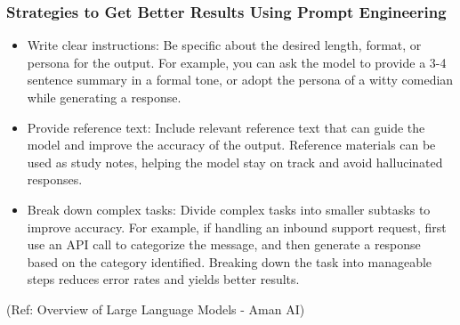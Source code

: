 \begin{frame}[fragile]\frametitle{Strategies to Get Better Results Using Prompt Engineering}

\begin{itemize}
\item Write clear instructions: Be specific about the desired length, format, or persona for the output. For example, you can ask the model to provide a 3-4 sentence summary in a formal tone, or adopt the persona of a witty comedian while generating a response.
\item Provide reference text: Include relevant reference text that can guide the model and improve the accuracy of the output. Reference materials can be used as study notes, helping the model stay on track and avoid hallucinated responses.
\item Break down complex tasks: Divide complex tasks into smaller subtasks to improve accuracy. For example, if handling an inbound support request, first use an API call to categorize the message, and then generate a response based on the category identified. Breaking down the task into manageable steps reduces error rates and yields better results.
\end{itemize}

{\tiny (Ref: Overview of Large Language Models - Aman AI)}

\end{frame}

